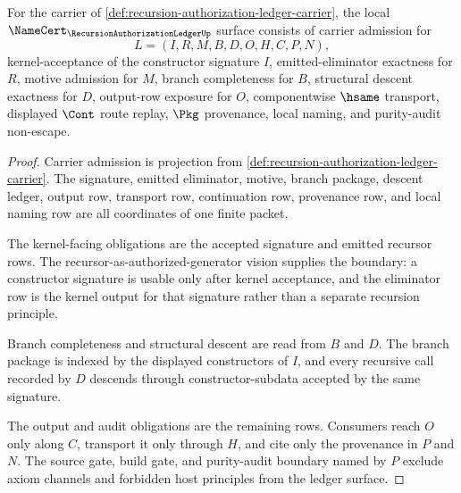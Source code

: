 \begin{theorem}
\label{thm:recursion-authorization-ledger-namecert-obligations}
For the carrier of \autoref{def:recursion-authorization-ledger-carrier}, the local $\NameCert_{\RecursionAuthorizationLedgerUp}$ surface consists of carrier admission for
$$
L=(I,R,M,B,D,O,H,C,P,N),
$$
kernel-acceptance of the constructor signature $I$, emitted-eliminator exactness for $R$, motive admission for $M$, branch completeness for $B$, structural descent exactness for $D$, output-row exposure for $O$, componentwise $\hsame$ transport, displayed $\Cont$ route replay, $\Pkg$ provenance, local naming, and purity-audit non-escape.
\end{theorem}
\begin{proof}
Carrier admission is projection from \autoref{def:recursion-authorization-ledger-carrier}. The signature, emitted eliminator, motive, branch package, descent ledger, output row, transport row, continuation row, provenance row, and local naming row are all coordinates of one finite packet.

The kernel-facing obligations are the accepted signature and emitted recursor rows. The recursor-as-authorized-generator vision supplies the boundary: a constructor signature is usable only after kernel acceptance, and the eliminator row is the kernel output for that signature rather than a separate recursion principle.

Branch completeness and structural descent are read from $B$ and $D$. The branch package is indexed by the displayed constructors of $I$, and every recursive call recorded by $D$ descends through constructor-subdata accepted by the same signature.

The output and audit obligations are the remaining rows. Consumers reach $O$ only along $C$, transport it only through $H$, and cite only the provenance in $P$ and $N$. The source gate, build gate, and purity-audit boundary named by $P$ exclude axiom channels and forbidden host principles from the ledger surface.
\end{proof}

